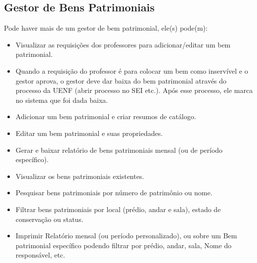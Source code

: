 \documentclass[12pt,a4paper]{article}
\begin{document}
\subsection{Gestor de Bens Patrimoniais}
Pode haver mais de um gestor de bem patrimonial, ele(s) pode(m):
\begin{itemize}
    \item Visualizar as requisições dos professores para adicionar/editar um bem patrimonial.
    \item Quando a requisição do professor é para colocar um bem como inservível e o gestor aprova, o gestor deve dar baixa do bem patrimonial através do processo da UENF (abrir processo no SEI etc.). Após esse processo, ele marca no sistema que foi dada baixa.
    \item Adicionar um bem patrimonial e criar resumos de catálogo.
    \item Editar um bem patrimonial e suas propriedades.
    \item Gerar e baixar relatório de bens patrimoniais mensal (ou de período específico).
    \item Visualizar os bens patrimoniais existentes.
    \item Pesquisar bens patrimoniais por número de patrimônio ou nome.
    \item Filtrar bens patrimoniais por local (prédio, andar e sala), estado de conservação ou status.
    \item Imprimir Relatório mensal (ou período personalizado), ou sobre um Bem patrimonial específico podendo filtrar por prédio, andar, sala, Nome do responsável, etc.
\end{itemize}

\end{document}
